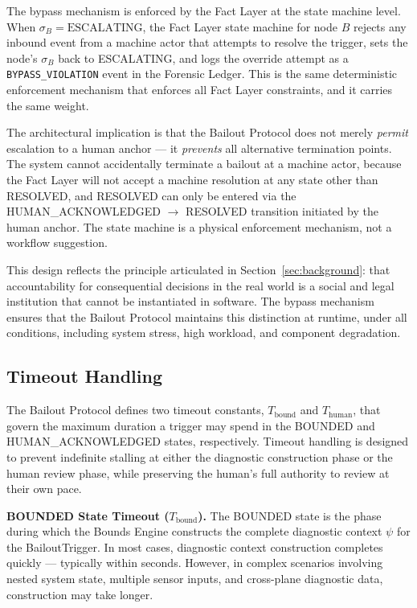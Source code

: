 \bigskip

The bypass mechanism is enforced by the Fact Layer at the state machine level. When $\sigma_B = \text{ESCALATING}$, the Fact Layer state machine for node $B$ rejects any inbound event from a machine actor that attempts to resolve the trigger, sets the node's $\sigma_B$ back to ESCALATING, and logs the override attempt as a \texttt{BYPASS\_VIOLATION} event in the Forensic Ledger. This is the same deterministic enforcement mechanism that enforces all Fact Layer constraints, and it carries the same weight.

The architectural implication is that the Bailout Protocol does not merely \textit{permit} escalation to a human anchor --- it \textit{prevents} all alternative termination points. The system cannot accidentally terminate a bailout at a machine actor, because the Fact Layer will not accept a machine resolution at any state other than RESOLVED, and RESOLVED can only be entered via the HUMAN\_ACKNOWLEDGED $\rightarrow$ RESOLVED transition initiated by the human anchor. The state machine is a physical enforcement mechanism, not a workflow suggestion.

This design reflects the principle articulated in Section~\ref{sec:background}: that accountability for consequential decisions in the real world is a social and legal institution that cannot be instantiated in software. The bypass mechanism ensures that the Bailout Protocol maintains this distinction at runtime, under all conditions, including system stress, high workload, and component degradation.

\subsection{Timeout Handling}
\label{sec:timeout-handling}

The Bailout Protocol defines two timeout constants, $T_{\text{bound}}$ and $T_{\text{human}}$, that govern the maximum duration a trigger may spend in the BOUNDED and HUMAN\_ACKNOWLEDGED states, respectively. Timeout handling is designed to prevent indefinite stalling at either the diagnostic construction phase or the human review phase, while preserving the human's full authority to review at their own pace.

\bigskip

\noindent\textbf{BOUNDED State Timeout ($T_{\text{bound}}$).} The BOUNDED state is the phase during which the Bounds Engine constructs the complete diagnostic context $\psi$ for the BailoutTrigger. In most cases, diagnostic context construction completes quickly --- typically within seconds. However, in complex scenarios involving nested system state, multiple sensor inputs, and cross-plane diagnostic data, construction may take longer.

